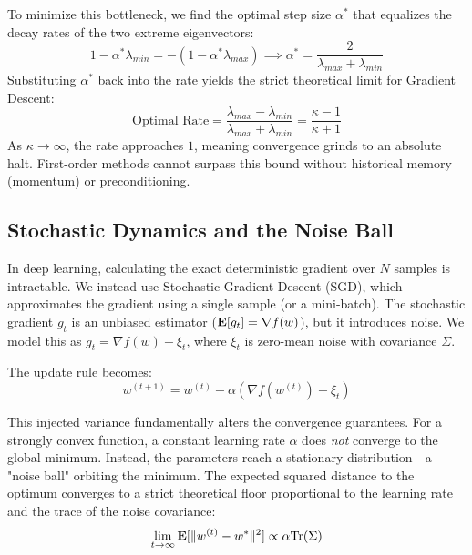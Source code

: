 To minimize this bottleneck, we find the optimal step size $\alpha^*$ that equalizes the decay rates of the two extreme eigenvectors:
\begin{equation}
1 - \alpha^* \lambda_{min} = -(1 - \alpha^* \lambda_{max}) \implies \alpha^* = \frac{2}{\lambda_{max} + \lambda_{min}}
\end{equation}
Substituting $\alpha^*$ back into the rate yields the strict theoretical limit for Gradient Descent:
\begin{equation}
\text{Optimal Rate} = \frac{\lambda_{max} - \lambda_{min}}{\lambda_{max} + \lambda_{min}} = \frac{\kappa - 1}{\kappa + 1}
\end{equation}
As $\kappa \to \infty$, the rate approaches $1$, meaning convergence grinds to an absolute halt. First-order methods cannot surpass this bound without historical memory (momentum) or preconditioning.

\subsection{Stochastic Dynamics and the Noise Ball}
In deep learning, calculating the exact deterministic gradient over $N$ samples is intractable. We instead use Stochastic Gradient Descent (SGD), which approximates the gradient using a single sample (or a mini-batch). The stochastic gradient $g_t$ is an unbiased estimator (${\bf E}[g_t] = \nabla f(w)$), but it introduces noise. We model this as $g_t = \nabla f(w) + \xi_t$, where $\xi_t$ is zero-mean noise with covariance $\Sigma$.

The update rule becomes:
\begin{equation}
w^{(t+1)} = w^{(t)} - \alpha (\nabla f(w^{(t)}) + \xi_t)
\end{equation}

This injected variance fundamentally alters the convergence guarantees. For a strongly convex function, a constant learning rate $\alpha$ does \textit{not} converge to the global minimum. Instead, the parameters reach a stationary distribution—a "noise ball" orbiting the minimum. The expected squared distance to the optimum converges to a strict theoretical floor proportional to the learning rate and the trace of the noise covariance:
\begin{equation}
\lim_{t \to \infty} {\bf E}[\|w^{(t)} - w^*\|^2] \propto \alpha \text{Tr}(\Sigma)
\end{equation}

